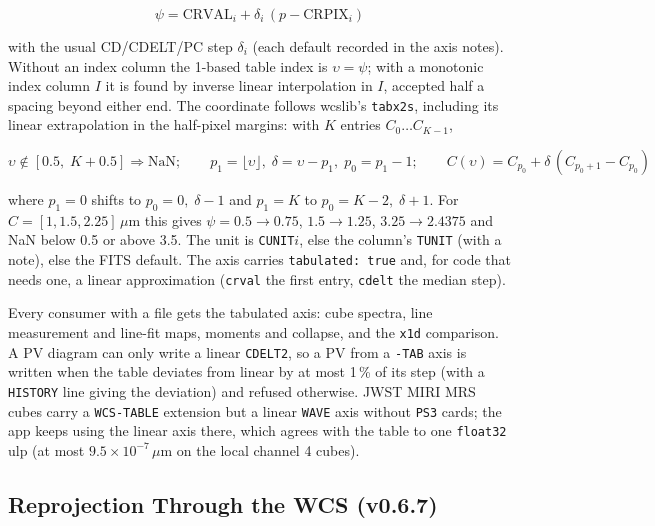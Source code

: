 \documentclass[11pt,a4paper]{article}
\newcommand{\code}[1]{\texttt{\small #1}}
\begin{document}
    \begin{equation}
        \psi = \text{CRVAL}_i + \delta_i\,(p - \text{CRPIX}_i)
    \end{equation}

    with the usual CD/CDELT/PC step $\delta_i$ (each default recorded in the axis notes). Without an index column the 1-based table index is $\upsilon = \psi$; with a monotonic index column $I$ it is found by inverse linear interpolation in $I$, accepted half a spacing beyond either end. The coordinate follows wcslib's \code{tabx2s}, including its linear extrapolation in the half-pixel margins: with $K$ entries $C_0 \ldots C_{K-1}$,

    \begin{equation}
        \upsilon \notin [0.5,\; K + 0.5] \Rightarrow \text{NaN}; \qquad
        p_1 = \lfloor \upsilon \rfloor,\; \delta = \upsilon - p_1,\; p_0 = p_1 - 1; \qquad
        C(\upsilon) = C_{p_0} + \delta\,(C_{p_0+1} - C_{p_0})
    \end{equation}

    where $p_1 = 0$ shifts to $p_0 = 0,\; \delta - 1$ and $p_1 = K$ to $p_0 = K - 2,\; \delta + 1$. For $C = [1, 1.5, 2.25]$\,$\mu$m this gives $\psi = 0.5 \to 0.75$, $1.5 \to 1.25$, $3.25 \to 2.4375$ and NaN below 0.5 or above 3.5. The unit is \code{CUNIT$i$}, else the column's \code{TUNIT} (with a note), else the FITS default. The axis carries \code{tabulated: true} and, for code that needs one, a linear approximation (\code{crval} the first entry, \code{cdelt} the median step).

    Every consumer with a file gets the tabulated axis: cube spectra, line measurement and line-fit maps, moments and collapse, and the \code{x1d} comparison. A PV diagram can only write a linear \code{CDELT2}, so a PV from a \code{-TAB} axis is written when the table deviates from linear by at most 1\,\% of its step (with a \code{HISTORY} line giving the deviation) and refused otherwise. JWST MIRI MRS cubes carry a \code{WCS-TABLE} extension but a linear \code{WAVE} axis without \code{PS3} cards; the app keeps using the linear axis there, which agrees with the table to one \code{float32} ulp (at most $9.5 \times 10^{-7}$\,$\mu$m on the local channel 4 cubes).

    \subsection{Reprojection Through the WCS (v0.6.7)}
    \label{sec:reproject_math}
\end{document}
